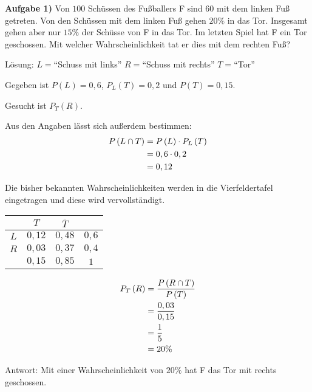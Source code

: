 \documentclass{article}
\begin{document}
\setcounter{section}{1}\setcounter{subsection}{0}



\textbf{Aufgabe 1)} Von $100$ Sch\"ussen des Fußballers F sind $60$ mit dem linken Fuß getreten. Von den Sch\"ussen mit dem linken Fuß gehen $20\%$ in das Tor. Insgesamt gehen aber nur $15\%$ der Sch\"usse von F in das Tor. Im letzten Spiel hat F ein Tor geschossen. Mit welcher Wahrscheinlichkeit tat er dies mit dem rechten Fuß?

L\"osung:
$L=$``Schuss mit links''
$R=$``Schuss mit rechts''
$T=$``Tor''

Gegeben ist $P\left(L\right) = 0,6$, $P_L\left(T\right)=0,2$ und $P\left(T\right)=0,15$.

Gesucht ist $P_T\left(R\right)$.

Aus den Angaben l\"asst sich außerdem bestimmen:
\begin{align} P\left(L \cap T\right) &= P\left(L\right) \cdot P_L\left(T\right) \notag \\
&= 0,6 \cdot 0,2 \notag \\
&= 0,12 \notag
\end{align}

Die bisher bekannten Wahrscheinlichkeiten werden in die Vierfeldertafel eingetragen und diese wird vervollst\"andigt.

\begin{center}


\renewcommand{\arraystretch}{1.7}
 \begin{tabular}{c|c|c|c}
 
 & $T$ & $\overline{T}$ & 
 \\
 \hline
 $L$ & $0,12$ & $0,48$ & $0,6$ \\
 \hline
 $R$ & $0,03$ & $0,37$ & $0,4$  \\ 
 \hline
 & $0,15$ & $0,85$ & $1$
 \end{tabular}
 
 \end{center}
 
 \begin{align}
 P_T\left(R\right) &= \frac{P\left(R \cap T\right)}{P\left(T\right)} \notag \\
 &= \frac{0,03}{0,15} \notag \\
 &= \frac{1}{5} \notag \\
 &= 20\% \notag
 \end{align}
 
 Antwort: Mit einer Wahrscheinlichkeit von $20\%$ hat F das Tor mit rechts geschossen.
 
\end{document}
